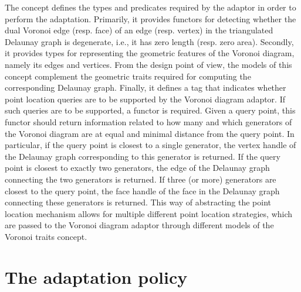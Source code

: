 The  concept defines the types and
predicates required by the adaptor in order to perform the
adaptation.
%
Primarily, it provides functors for detecting whether the dual Voronoi
edge (resp. face) of an edge (resp. vertex) in the triangulated
Delaunay graph is degenerate, i.e., it has zero length (resp. zero
area). Secondly, it provides types for representing the 
geometric features of the Voronoi diagram, namely its edges and
vertices. From the design point of view, the models of this concept
complement the geometric traits required for computing the
corresponding Delaunay graph.
%
Finally, it defines a tag that indicates whether point
location queries are to be supported by the Voronoi diagram
adaptor. If such queries are to be supported, a functor is
required. Given a query point, this functor should return information
related to how many and which generators of the Voronoi diagram are at
equal and minimal distance from the query point. In particular, if the
query point is closest to a single generator, the vertex handle of the
Delaunay graph corresponding to this generator is returned. If the
query point is closest to exactly two generators, the edge of the
Delaunay graph connecting the two generators is returned. If three (or
more) generators are closest to the query point, the face handle of
the face in the Delaunay graph connecting these generators is
returned. This way of abstracting the point location mechanism allows
for multiple different point location strategies, which are passed to
the Voronoi diagram adaptor through different models of the Voronoi
traits concept.


\section{The adaptation policy}
\label{sec:vda2-policy}
